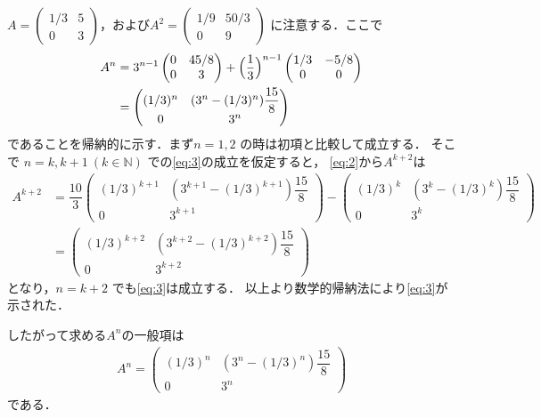 \documentclass[../../main.tex]{subfiles}
\begin{document}
$A =
\begin{pmatrix} 1/3 & 5 \\ 0 & 3
\end{pmatrix}$，および$A^2 =
\begin{pmatrix} 1/9 & 50/3 \\ 0 & 9
\end{pmatrix}$ に注意する．ここで
\begin{align}
  A^n &= 3^{n-1}
  \begin{pmatrix} 0 & 45/8 \\ 0 & 3
  \end{pmatrix} + \Bigl(\dfrac{1}{3}\Bigr)^{n-1}
  \begin{pmatrix} 1/3 & -5/8 \\ 0 & 0
  \end{pmatrix} \\
  &=
  \begin{pmatrix} (1/3)^n & (3^n - (1/3)^n)\dfrac{15}{8} \\ 0 & 3^n
  \end{pmatrix} \label{eq:3}
\end{align}
であることを帰納的に示す．まず$n=1,2$ の時は初項と比較して成立する．
そこで $n=k, k+1 \ (k \in \mathbb{N})$ での\cref{eq:3}の成立を仮定すると，
\cref{eq:2}から$A^{k+2}$は
\begin{align}
  A^{k+2} &= \dfrac{10}{3}
  \begin{pmatrix} (1/3)^{k+1} & (3^{k+1} - (1/3)^{k+1})\dfrac{15}{8} \\ 0 & 3^{k+1}
  \end{pmatrix} -
  \begin{pmatrix} (1/3)^k & (3^k - (1/3)^k)\dfrac{15}{8} \\ 0 & 3^k
  \end{pmatrix} \\
  &=
  \begin{pmatrix} (1/3)^{k+2} & (3^{k+2} - (1/3)^{k+2})\dfrac{15}{8} \\ 0 & 3^{k+2}
  \end{pmatrix}
\end{align}
となり，$n=k+2$ でも\cref{eq:3}は成立する．
以上より数学的帰納法により\cref{eq:3}が示された．

したがって求める$A^n$の一般項は
\begin{align}
  A^n =
  \begin{pmatrix} (1/3)^n & (3^n - (1/3)^n)\dfrac{15}{8} \\ 0 & 3^n
  \end{pmatrix}
\end{align}
である．
\end{document}
